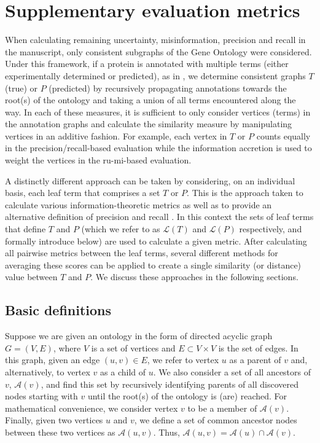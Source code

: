 \section{Supplementary evaluation metrics}

When calculating remaining uncertainty, misinformation, precision and recall in the manuscript, only consistent subgraphs of the Gene Ontology were considered. Under this framework, if a protein is annotated with multiple terms (either experimentally determined or predicted), as in \Cref{}, we determine consistent graphs $T$ (true) or $P$ (predicted) by recursively propagating annotations towards the root(s) of the ontology and taking a union of all terms encountered along the way. In each of these measures, it is sufficient to only consider vertices (terms) in the annotation graphs and calculate the similarity measure by manipulating vertices in an additive fashion. For example, each vertex in $T$ or $P$ counts equally in the precision/recall-based evaluation while the information accretion is used to weight the vertices in the ru-mi-based evaluation. 

A distinctly different approach can be taken by considering, on an individual basis, each leaf term that comprises a set $T$ or $P$. This is the approach taken to calculate various information-theoretic metrics \citep{Resnik1995, Jiang1997, Lin1998, Lord2003, Schlicker2006} as well as to provide an alternative definition of precision and recall \citep{Verspoor2006}. In this context the sets of leaf terms that define $T$ and $P$ (which we refer to as $\mathcal{L}(T)$ and $\mathcal{L}(P)$ respectively, and formally introduce below) are used to calculate a given metric. After calculating all pairwise metrics between the leaf terms, several different methods for averaging these scores can be applied to create a single similarity (or distance) value between $T$ and $P$.  We discuss these approaches in the following sections.

\subsection{Basic definitions}

Suppose we are given an ontology in the form of directed acyclic graph $G=(V, E)$, where $V$ is a set of vertices and $E\subset V\times V$ is the set of edges. In this graph, given an edge $(u,v) \in E$, we refer to vertex $u$ as a parent of $v$ and, alternatively, to vertex $v$ as a child of $u$. We also consider a set of all ancestors of $v$, $\mathcal{A}(v)$, and find this set by recursively identifying parents of all discovered nodes starting with $v$ until the root(s) of the ontology is (are) reached. For mathematical convenience, we consider vertex $v$ to be a member of $\mathcal{A}(v)$. Finally, given two vertices $u$ and $v$, we define a set of common ancestor nodes between these two vertices as $\mathcal{A}(u,v)$. Thus, $\mathcal{A}(u,v)= \mathcal{A}(u)\cap \mathcal{A}(v)$.

